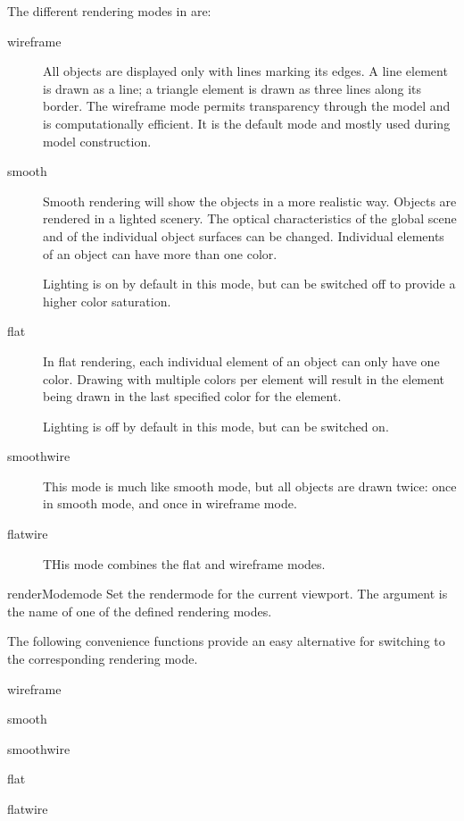 The different rendering modes in \pyformex are:
\begin{description}
  \item[wireframe] All objects are displayed only with lines marking its edges. A line element is drawn as a line; a triangle element is drawn as three lines along its border. The wireframe mode permits transparency through the model and is computationally efficient. It is the default mode and mostly used during model construction.

  \item[smooth] Smooth rendering will show the objects in a more realistic way. Objects are rendered in a lighted scenery. The optical characteristics of the global scene and of the individual object surfaces can be changed. Individual elements of an object can have more than one color. 

Lighting is on by default in this mode, but can be switched off to provide a higher color saturation.

\item[flat] In flat rendering, each individual element of an object can only have one color. Drawing with multiple colors per element will result in the element being drawn in the last specified color for the element. 

Lighting is off by default in this mode, but can be switched on.

\item[smoothwire] This mode is much like smooth mode, but all objects are drawn twice: once in smooth mode, and once in wireframe mode.

\item[flatwire]  THis mode combines the flat and wireframe modes.

\end{description}


\begin{funcdesc}{renderMode}{mode}
Set the rendermode for the current viewport. The argument is the name of one of the defined rendering modes.
\end{funcdesc}

The following convenience functions provide an easy alternative for switching to the corresponding rendering mode.
    
\begin{funcdesc}{wireframe}{}
\end{funcdesc}
\begin{funcdesc}{smooth}{}
\end{funcdesc}
\begin{funcdesc}{smoothwire}{}
\end{funcdesc}
\begin{funcdesc}{flat}{}
\end{funcdesc}
\begin{funcdesc}{flatwire}{}
\end{funcdesc}



